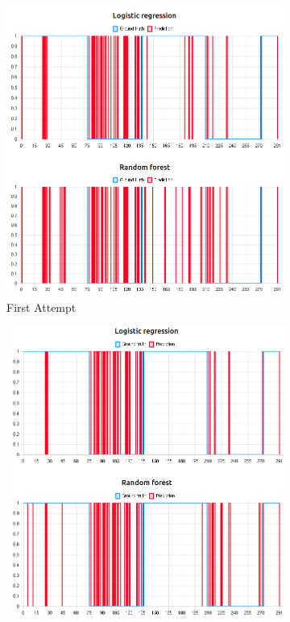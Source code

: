 \documentclass[10pt, conference]{IEEEtran}
\begin{document}
\begin{figure}[t]
    \centering
    \begin{subfigure}[b]{.33\linewidth}
        \centering
        \includegraphics[width=\linewidth]{resources/prediction_with_basic_features_cropped.png}
        \caption{First Attempt}
        \label{fig:chart-first-attempt}
    \end{subfigure}%
    \begin{subfigure}[b]{.33\linewidth}
        \centering
        \includegraphics[width=\linewidth]{resources/prediction_with_inbound_and_outbound_features_cropped.png}

\end{subfigure}
\end{figure}
\end{document}
